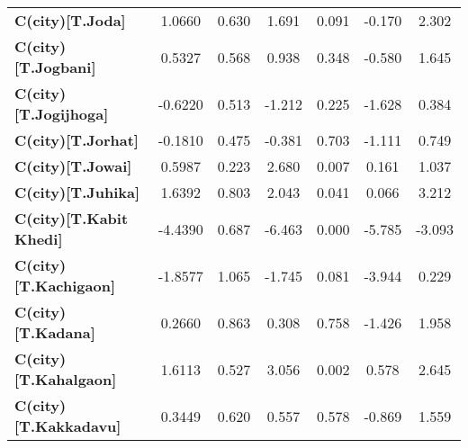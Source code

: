 \begin{center}
\begin{tabular}{lcccccc}
\textbf{C(city)[T.Joda]}                                                                            &       1.0660  &        0.630     &     1.691  &         0.091        &       -0.170    &        2.302     \\
\textbf{C(city)[T.Jogbani]}                                                                         &       0.5327  &        0.568     &     0.938  &         0.348        &       -0.580    &        1.645     \\
\textbf{C(city)[T.Jogijhoga]}                                                                       &      -0.6220  &        0.513     &    -1.212  &         0.225        &       -1.628    &        0.384     \\
\textbf{C(city)[T.Jorhat]}                                                                          &      -0.1810  &        0.475     &    -0.381  &         0.703        &       -1.111    &        0.749     \\
\textbf{C(city)[T.Jowai]}                                                                           &       0.5987  &        0.223     &     2.680  &         0.007        &        0.161    &        1.037     \\
\textbf{C(city)[T.Juhika]}                                                                          &       1.6392  &        0.803     &     2.043  &         0.041        &        0.066    &        3.212     \\
\textbf{C(city)[T.Kabit Khedi]}                                                                     &      -4.4390  &        0.687     &    -6.463  &         0.000        &       -5.785    &       -3.093     \\
\textbf{C(city)[T.Kachigaon]}                                                                       &      -1.8577  &        1.065     &    -1.745  &         0.081        &       -3.944    &        0.229     \\
\textbf{C(city)[T.Kadana]}                                                                          &       0.2660  &        0.863     &     0.308  &         0.758        &       -1.426    &        1.958     \\
\textbf{C(city)[T.Kahalgaon]}                                                                       &       1.6113  &        0.527     &     3.056  &         0.002        &        0.578    &        2.645     \\
\textbf{C(city)[T.Kakkadavu]}                                                                       &       0.3449  &        0.620     &     0.557  &         0.578        &       -0.869    &        1.559     \\

\end{tabular}
\end{center}
